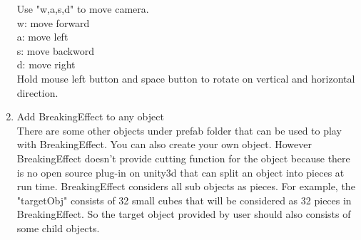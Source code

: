 \documentclass[12pt, titlepage]{article}
\begin{document}
\begin{enumerate}
		Use "w,a,s,d" to move camera.\\
		w: move forward\\
		a: move left\\
		s: move backword\\
		d: move right\\
		Hold mouse left button and space button to rotate on vertical and horizontal direction.
		\item{Add BreakingEffect to any object}\\
		There are some other objects under prefab folder that can be used to play with BreakingEffect. You can also create your own object. However BreakingEffect doesn't provide cutting function for the object because there is no open source plug-in on unity3d that can split an object into pieces at run time. BreakingEffect considers all sub objects as pieces. For example, the "targetObj" consists of 32 small cubes that will be considered as 32 pieces in BreakingEffect. So the target object provided by user should also consists of some child objects.
	\end{enumerate}
\end{document}
